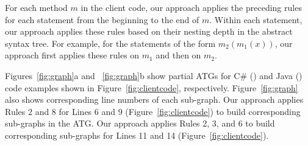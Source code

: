 For each method $m$ in the client code, our approach applies the preceding
rules for each statement from the beginning to the end of $m$.
Within each statement, our approach applies these rules based on
their nesting depth in the abstract syntax tree. For example,
for the statements of the form $m_2(m_1(x))$, our approach first applies
these rules on $m_1$ and then on $m_2$.

Figures~\ref{fig:graph}a and ~\ref{fig:graph}b show partial ATGs for
C\# () and Java ()
code examples shown in Figure~\ref{fig:clientcode}, respectively.
Figure~\ref{fig:graph} also shows corresponding line numbers of each
sub-graph. Our approach applies Rules 2 and 8 for Lines 6 and 9
(Figure~\ref{fig:clientcode}) to build corresponding sub-graphs in
the ATG. Our approach applies Rules 2, 3, and 6 to build corresponding
sub-graphs for Lines 11 and 14 (Figure~\ref{fig:clientcode}). 


